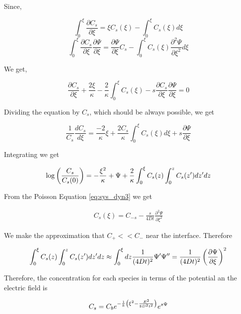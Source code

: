 Since,

\begin{equation}
	\int_0^\xi \frac{\partial C_s}{\partial \xi} = \xi C_s(\xi) - \int_0^\xi C_s(\xi) d\xi
\end{equation}
\begin{equation}
	\int_0^\xi \frac{\partial C_s}{\partial \xi}\frac{\partial \Psi}{\partial \xi} = \frac{\partial \Psi}{\partial \xi} C_s - \int_0^\xi C_s(\xi) \frac{\partial^2 \Psi}{\partial \xi^2} d\xi
\end{equation}

We get,

\begin{equation}
	\frac{\partial C_s}{\partial \xi} + \frac{2\xi}{\kappa} - \frac{2}{\kappa} \int_0^\xi C_s(\xi)-s\frac{\partial C_s}{\partial \xi}\frac{\partial \Psi}{\partial \xi} = 0
\end{equation}

Dividing the equation by $C_s$, which should be always possible, we get

\begin{equation}
\frac{1}{C_s}\frac{d C_s}{d\xi} = \frac{-2}{\kappa}\xi + \frac{2C_s}{\kappa}\int_0^\xi C_s(\xi) d\xi + s\frac{\partial \Psi}{\partial \xi}	
\end{equation}

Integrating we get

\begin{equation}
	\log\left({\frac{C_s}{C_s(0)}}\right) = -\frac{\xi^2}{\kappa} + \Psi + \frac{2}{\kappa} \int_0^\xi C_s(z)\int_0^z C_s (z')dz' dz
\end{equation}

From the Poisson Equation \ref{eq:sys_dyn3} we get

\begin{eqnarray*}
	C_s(\xi) = C_{-s}-\frac{s}{4Dt}\frac{\partial^2 \Psi}{\partial \xi^2}
\end{eqnarray*}

We make the approximation that $C_+ << C_-$ near the interface. Therefore

\begin{equation}
	\int_0^\xi C_s(z)\int_0^z C_s (z')dz' dz \approx \int_0^\xi  dz \frac{1}{(4Dt)^2}\Psi' \Psi '' = \frac{1}{(4Dt)^2}\left({\frac{\partial \Psi}{\partial \xi}}\right)^2
\end{equation}

Therefore, the concentration for each species in terms of the potential an the electric field is

\begin{equation}
	C_s = C_b e^{-\frac{1}{k}\left({\xi^2 - \frac{E^2}{8D^2t^2}}\right)}  e^{s\Psi}
\end{equation}

